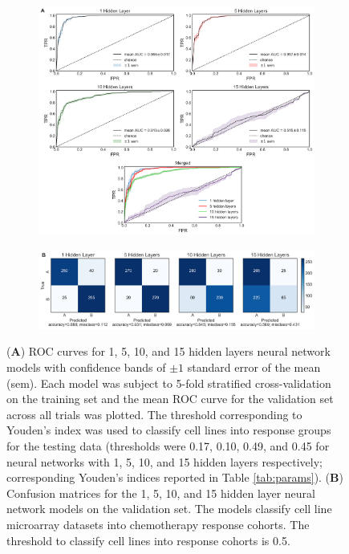 \documentclass[10pt, letterpaper, twocolumn]{article}
\begin{document}
\begin{figure}[!ht]
	\centering
		\begin{subfigure}[t]{\textwidth}
			\centering
			\includegraphics[width=\textwidth]{Figures/roc/cv_roc.png}
		\end{subfigure}

	\begin{subfigure}[t]{\textwidth}
		\centering
		\includegraphics[width=\textwidth]{Figures/confusion_matrix/cm_combined.png}
	\end{subfigure}
	
	\caption{(\textbf{A}) ROC curves for 1, 5, 10, and 15 hidden layers neural network models with confidence bands of $\pm 1$ standard error of the mean (sem). Each model was subject to 5-fold stratified cross-validation on the training set and the mean ROC curve for the validation set across all trials was plotted. The threshold corresponding to Youden's index was used to classify cell lines into response groups for the testing data (thresholds were 0.17, 0.10, 0.49, and 0.45 for neural networks with 1, 5, 10, and 15 hidden layers respectively; corresponding Youden's indices reported in Table \ref{tab:params}). (\textbf{B}) Confusion matrices for the 1, 5, 10, and 15 hidden layer neural network models on the validation set. The models classify cell line microarray datasets into chemotherapy response cohorts. The threshold to classify cell lines into response cohorts is 0.5.}
	\label{fig:nnet_train}
\end{figure}
\end{document}
